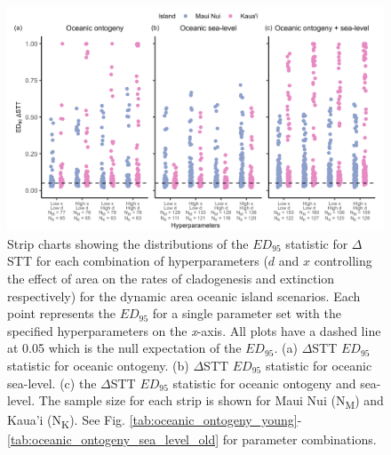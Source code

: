 \documentclass{article}
\begin{document}
\clearpage

\begin{figure}
    \centering
    \includegraphics[width=\textwidth]{JBI-21-0508_Fig5.png}
    \caption{Strip charts showing the distributions of the $ED_{95}$ statistic for $\Delta$STT for each combination of hyperparameters ($d$ and $x$ controlling the effect of area on the rates of cladogenesis and extinction respectively) for the dynamic area oceanic island scenarios. Each point represents the $ED_{95}$ for a single parameter set with the specified hyperparameters on the \textit{x}-axis. All plots have a dashed line at 0.05 which is the null expectation of the $ED_{95}$. (a) $\Delta$STT $ED_{95}$ statistic for oceanic ontogeny. (b) $\Delta$STT $ED_{95}$ statistic for oceanic sea-level. (c) the $\Delta$STT $ED_{95}$ statistic for oceanic ontogeny and sea-level. The sample size for each strip is shown for Maui Nui (N\textsubscript{M}) and Kaua'i (N\textsubscript{K}). See Fig. \ref{tab:oceanic_ontogeny_young}-\ref{tab:oceanic_ontogeny_sea_level_old} for parameter combinations.}
    \label{fig:Hyperparameters_spec_nltt}
\end{figure}

\clearpage
\end{document}
